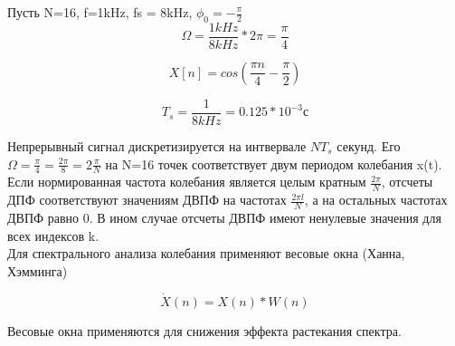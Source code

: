 Пусть N=16, f=1kHz, fs = 8kHz, $\phi_0 = -\frac{\pi}{2}$ \\

$$\Omega = \frac{1kHz}{8kHz}*2\pi = \frac{\pi}{4}$$

$$X[n] = cos(\frac{\pi n}{4} - \frac{\pi}{2})$$

$$T_s = \frac{1}{8kHz} = 0.125*10^{-3}с$$

Непрерывный сигнал дискретизируется на интвервале $NT_s$ секунд. Его $\Omega = \frac{\pi}{4} = \frac{2\pi}{8} = 2\frac{\pi}{N}$ на
N=16 точек соответствует двум периодом колебания x(t). Если нормированная частота колебания является целым кратным $\frac{2\pi}{N}$,
отсчеты ДПФ соответствуют значениям ДВПФ на частотах $\frac{2\pi l}{N}$, а на остальных частотах ДВПФ равно 0. В ином случае отсчеты
ДВПФ имеют ненулевые значения для всех индексов k. \\

Для спектрального анализа колебания применяют весовые окна (Ханна, Хэмминга)

$$\dot{X}(n) = X(n)*W(n)$$

Весовые окна применяются для снижения эффекта растекания спектра.

\endinput